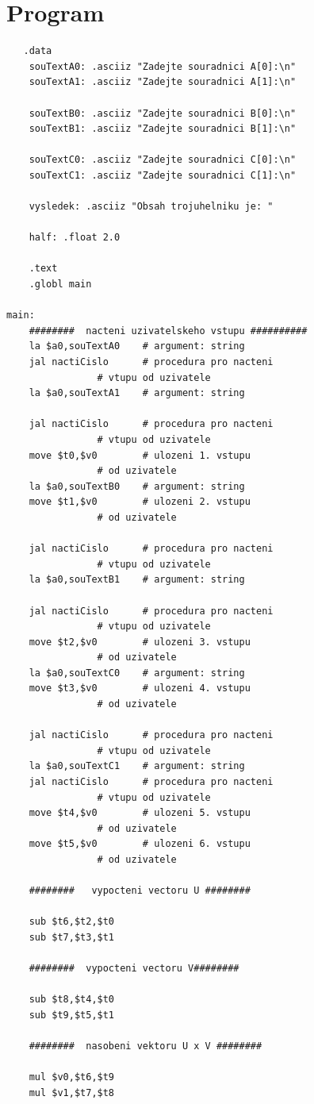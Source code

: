 \chapter{Program}
\lstset{language=[mips]Assembler}
\begin{lstlisting}
   .data
	souTextA0: .asciiz "Zadejte souradnici A[0]:\n"
	souTextA1: .asciiz "Zadejte souradnici A[1]:\n"

	souTextB0: .asciiz "Zadejte souradnici B[0]:\n"
	souTextB1: .asciiz "Zadejte souradnici B[1]:\n"

	souTextC0: .asciiz "Zadejte souradnici C[0]:\n"
	souTextC1: .asciiz "Zadejte souradnici C[1]:\n"	
	
	vysledek: .asciiz "Obsah trojuhelniku je: "
	
	half: .float 2.0
	
	.text
	.globl main
	
main:	
	########  nacteni uzivatelskeho vstupu ##########
	la $a0,souTextA0	# argument: string
	jal nactiCislo		# procedura pro nacteni
				# vtupu od uzivatele
	la $a0,souTextA1	# argument: string	
	
	jal nactiCislo		# procedura pro nacteni
				# vtupu od uzivatele
	move $t0,$v0		# ulozeni 1. vstupu
				# od uzivatele
	la $a0,souTextB0	# argument: string
	move $t1,$v0		# ulozeni 2. vstupu
				# od uzivatele
			
	jal nactiCislo		# procedura pro nacteni
				# vtupu od uzivatele
	la $a0,souTextB1	# argument: string
		
	jal nactiCislo		# procedura pro nacteni
				# vtupu od uzivatele
	move $t2,$v0		# ulozeni 3. vstupu
				# od uzivatele		
	la $a0,souTextC0	# argument: string
	move $t3,$v0		# ulozeni 4. vstupu
				# od uzivatele	
	
	jal nactiCislo		# procedura pro nacteni
				# vtupu od uzivatele
	la $a0,souTextC1	# argument: string
	jal nactiCislo		# procedura pro nacteni
				# vtupu od uzivatele
	move $t4,$v0		# ulozeni 5. vstupu
				# od uzivatele
	move $t5,$v0		# ulozeni 6. vstupu
				# od uzivatele

	########   vypocteni vectoru U ########  
		
	sub $t6,$t2,$t0		
	sub $t7,$t3,$t1
	
	########  vypocteni vectoru V########  
	
	sub $t8,$t4,$t0
	sub $t9,$t5,$t1
	 	
  	########  nasobeni vektoru U x V ########  
  	
  	mul $v0,$t6,$t9
	mul $v1,$t7,$t8
  	

\end{lstlisting}
